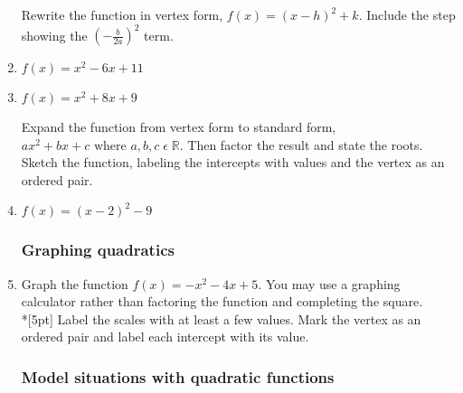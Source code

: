 \documentclass[12pt, oneside]{article}
\begin{document}
\begin{enumerate}
Rewrite the function in vertex form, $f(x)=(x-h)^2+k$. Include the step showing the $(-\frac{b}{2a})^2$ term.
\item   $f(x)=x^2-6x+11$
\vspace{3cm}
\item   $f(x)=x^2+8x+9$
\vspace{3cm}

Expand the function from vertex form to standard form, $ax^2+bx+c \text{ where } a, b, c \;  \epsilon \; \mathbb{R}$. Then factor the result and state the roots. Sketch the function, labeling the intercepts with values and the vertex as an ordered pair.
\item   $f(x)=(x-2)^2-9$
  \begin{flushright} %
  \end{flushright}

\newpage
\subsubsection*{Graphing quadratics}
\item Graph the function $f(x)=-x^2-4x+5$. You may use a graphing calculator rather than factoring the function and completing the square.\\*[5pt]
Label the scales with at least a few values. Mark the vertex as an ordered pair and label each intercept with its value.\\

\begin{center} %
\end{center}

\newpage
\subsubsection*{Model situations with quadratic functions}


\end{enumerate}
\end{document}
